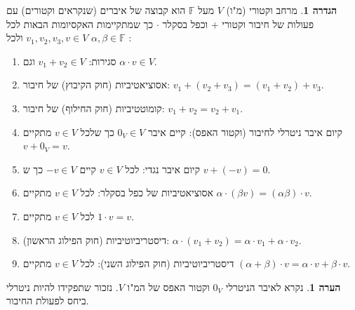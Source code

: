 \documentclass[12pt]{report}
\theoremstyle{plain}
\theoremstyle{definition}
\newtheorem{definition}[theorem]{הגדרה}
\newtheorem{remark}{הערה}[chapter]
\newcommand{\F}{\mathbb{F}}
\newcommand{\0}{\mathbf{0}}
\begin{document}
\begin{definition}\label{def:vector-space}
מרחב וקטורי (מ"ו)
$V$
מעל
$\F$
הוא קבוצה של איברים
(שנקראים וקטורים)
עם פעולות של חיבור וקטורי
$+$
וכפל בסקלר
$\cdot$
כך שמתקיימות האקסיומות הבאות לכל  
$v_1,v_2,v_3,v \in V $  
ולכל  
$ \alpha,\beta \in \F $  
:

\begin{enumerate}[label=\alph*.]
\item 
סגירות:
$v_1+v_2\in V$
וגם
$\alpha\cdot v\in V$.


\item
אסוציאטיביות (חוק הקיבוץ) של חיבור:  
$ v_1 + (v_2 + v_3) = (v_1 + v_2) + v_3 $.


\item
קומוטטיביות (חוק החילוף) של חיבור:  
$ v_1 + v_2 = v_2 + v_1 $.


\item
קיום איבר ניטרלי לחיבור (וקטור האפס): קיים איבר  
$0_V \in V$  
כך שלכל  
$v \in V$  
מתקיים  
$v + 0_V = v$.


\item
קיום איבר נגדי: לכל  
$v \in V$  
קיים  
$-v \in V $  
כך ש  
$v + (-v) = 0$.


\item
אסוציאטיביות של כפל בסקלר: 
לכל  
$v\in V $  
מתקיים
$\alpha\cdot(\beta v) = (\alpha\beta)\cdot v$.


\item   
לכל  
$v\in V$  
מתקיים 
$1\cdot v = v$.


\item 
דיסטריביוטיביות (חוק הפילוג הראשון):
$\alpha\cdot(v_1 + v_2) = \alpha\cdot v_1 + \alpha\cdot v_2$.


\item 
דיסטריביוטיביות (חוק הפילוג השני):
לכל  
$ v \in V $  
מתקיים
$(\alpha + \beta)\cdot v = \alpha\cdot v + \beta\cdot v$.


\end{enumerate}
\end{definition}

\begin{remark}
נקרא לאיבר הניטרלי 
$0_V$
וקטור האפס של המ"ו 
$V$.
נזכור שתפקידו להיות ניטרלי ביחס לפעולת החיבור.
\end{remark}
\end{document}

